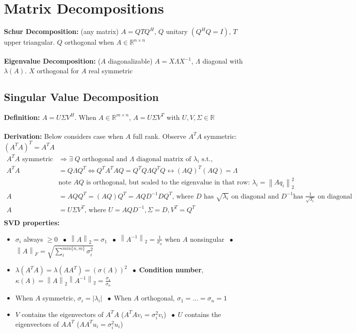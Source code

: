 \documentclass{article}
\newcommand{\norm}[2]{\left\lVert#1\right\rVert_#2}
\newcommand{\abs}[1]{\lvert#1\rvert}
\newcommand*\bspace{$\; \bullet \;$}
\begin{document}
\section{Matrix Decompositions}
\textbf{Schur Decomposition:} (any matrix) $A = QTQ^H$, $Q$ unitary $(Q^HQ = I)$, $T$ upper triangular. $Q$ orthogonal when $A \in \mathbb{R}^{n \times n}$\\ \\
\textbf{Eigenvalue Decomposition:} ($A$ diagonalizable) $A = X \Lambda X^{-1}$, $\Lambda$ diagonal with $\lambda(A)$. $X$ orthogonal for $A$ real symmetric

\subsection{Singular Value Decomposition}
\textbf{Definition:} $A = U\Sigma V^H$. When $A \in \mathbb{R}^{m \times n}$, $A = U\Sigma V^T$ with $U, V, \Sigma \in \mathbb{R}$ \\ \\
\textbf{Derivation:} Below considers case when $A$ full rank. Observe $A^TA$ symmetric: $(A^TA)^T = A^TA$
\begin{align*}
    A^TA \textrm{ symmetric} &\Rightarrow \exists \; Q \textrm{ orthogonal and } \Lambda \textrm{ diagonal matrix of $\lambda_i$ s.t., }\\
    A^TA & = Q\Lambda Q^T \Longleftrightarrow Q^TA^TAQ = Q^TQ\Lambda Q^TQ \longleftrightarrow (AQ)^T(AQ) = \Lambda\\
    &\textrm{note $AQ$ is orthogonal, but scaled to the eigenvalue in that row: }\lambda_i  = \norm{Aq_i}{2}^2\\
    A &= AQQ^T = (AQ) Q^T = AQD^{-1}DQ^T \textrm{, where } D \textrm{ has $\sqrt{\lambda_i}$ on diagonal and } D^{-1} \textrm{has $\frac{1}{\sqrt{\lambda_i}}$ on diagonal}\\
    A &= U\Sigma V^T \textrm{, where } U  = AQD^{-1}, \Sigma = D, V^T = Q^T\\
\end{align*}
\textbf{SVD properties:} 
\begin{itemize}
    \item $\sigma_i$ always $\geq0$ \bspace $\norm{A}{2} = \sigma_1$ \bspace $\norm{A^{-1}}{2} = \frac{1}{\sigma_n}$ when $A$ nonsingular \bspace $\norm{A}{F} = \sqrt{\sum_i^{min\{n,m\}}\sigma_i^2}$
    \item $\lambda(A^TA) = \lambda(AA^T) = (\sigma(A))^2$ \bspace \textbf{Condition number}, $\kappa(A) = \norm{A}{2}\norm{A^{-1}}{2} = \frac{\sigma_1}{\sigma_n}$
    \item When $A$ symmetric, $\sigma_i = \abs{\lambda_i}$ \bspace When $A$ orthogonal, $\sigma_1 = \dots = \sigma_n = 1$
    \item $V$ contains the eigenvectors of $A^TA$ ($A^TAv_i = \sigma_i^2v_i$) \bspace $U$ contains the eigenvectors of $AA^T$ ($AA^Tu_i = \sigma_i^2u_i$)
\end{itemize}
\end{document}

